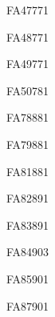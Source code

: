 \documentclass[a4paper,11pt]{report}
\begin{document}
\begin{exol}{FA47}{77}{1} %
\end{exol}

\begin{exol}{FA48}{77}{1} %
\end{exol}

\begin{exol}{FA49}{77}{1} %
\end{exol}

\begin{exol}{FA50}{78}{1} %
\end{exol}

\begin{exol}{FA78}{88}{1} %
\end{exol}

\begin{exol}{FA79}{88}{1} %
\end{exol}



\begin{exol}{FA81}{88}{1} %
\end{exol}

\begin{exol}{FA82}{89}{1} %
\end{exol}

\begin{exol}{FA83}{89}{1} %
\end{exol}

\begin{exol}{FA84}{90}{3} %
\end{exol}

\begin{exol}{FA85}{90}{1} %
\end{exol}

\begin{exol}{FA87}{90}{1} %
\end{exol}
\end{document}
